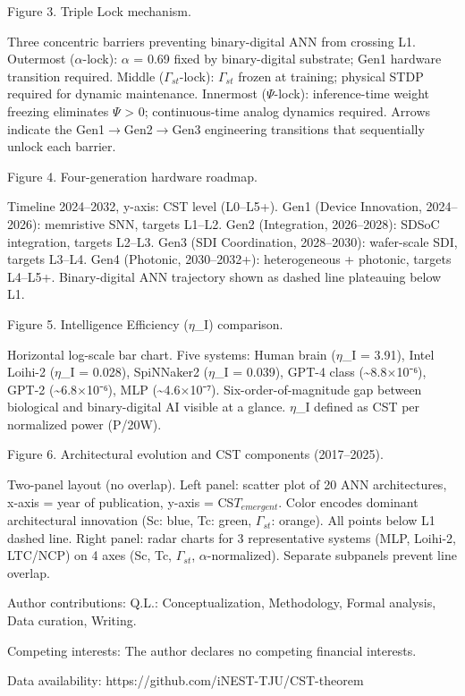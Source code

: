 \documentclass[a4paper,12pt]{article}
\begin{document}
Figure 3. Triple Lock mechanism.

Three concentric barriers preventing binary-digital ANN from crossing L1.
Outermost ($\alpha$-lock): $\alpha$ = 0.69 fixed by binary-digital substrate; Gen1 hardware transition required.
Middle ($\Gamma_{st}$-lock): $\Gamma_{st}$ frozen at training; physical STDP required for dynamic maintenance.
Innermost ($\Psi$-lock): inference-time weight freezing eliminates $\Psi$ > 0; continuous-time analog dynamics required.
Arrows indicate the Gen1$\rightarrow$Gen2$\rightarrow$Gen3 engineering transitions that sequentially unlock each barrier.

Figure 4. Four-generation hardware roadmap.

Timeline 2024--2032, y-axis: CST level (L0--L5+). Gen1 (Device Innovation, 2024--2026): memristive SNN, targets L1--L2. Gen2 (Integration, 2026--2028): SDSoC integration, targets L2--L3. Gen3 (SDI Coordination, 2028--2030): wafer-scale SDI, targets L3--L4. Gen4 (Photonic, 2030--2032+): heterogeneous + photonic, targets L4--L5+. Binary-digital ANN trajectory shown as dashed line plateauing below L1.

Figure 5. Intelligence Efficiency ($\eta$\_I) comparison.

Horizontal log-scale bar chart. Five systems: Human brain ($\eta$\_I = 3.91), Intel Loihi-2 ($\eta$\_I = 0.028), SpiNNaker2 ($\eta$\_I = 0.039), GPT-4 class (\textasciitilde{}8.8$\times$10⁻⁶), GPT-2 (\textasciitilde{}6.8$\times$10⁻⁶), MLP (\textasciitilde{}4.6$\times$10⁻⁷). Six-order-of-magnitude gap between biological and binary-digital AI visible at a glance. $\eta$\_I defined as CST per normalized power (P/20W).

Figure 6. Architectural evolution and CST components (2017--2025).

Two-panel layout (no overlap). Left panel: scatter plot of 20 ANN architectures, x-axis = year of publication, y-axis = CS$T_{emergent}$. Color encodes dominant architectural innovation (Sc: blue, Tc: green, $\Gamma_{st}$: orange). All points below L1 dashed line. Right panel: radar charts for 3 representative systems (MLP, Loihi-2, LTC/NCP) on 4 axes (Sc, Tc, $\Gamma_{st}$, $\alpha$-normalized). Separate subpanels prevent line overlap.

Author contributions: Q.L.: Conceptualization, Methodology, Formal analysis, Data curation, Writing.

Competing interests: The author declares no competing financial interests.

Data availability: https://github.com/iNEST-TJU/CST-theorem
\end{document}
